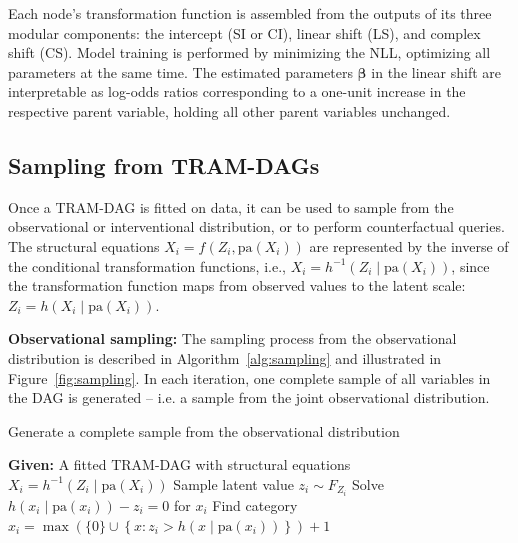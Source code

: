 Each node's transformation function is assembled from the outputs of its three modular components: the intercept (SI or CI), linear shift (LS), and complex shift (CS). Model training is performed by minimizing the NLL, optimizing all parameters at the same time. The estimated parameters $\boldsymbol{\beta}$ in the linear shift are interpretable as log-odds ratios corresponding to a one-unit increase in the respective parent variable, holding all other parent variables unchanged.




\subsection{Sampling from TRAM-DAGs} \label{methods:sampling}

Once a TRAM-DAG is fitted on data, it can be used to sample from the observational or interventional distribution, or to perform counterfactual queries. The structural equations $X_i = f(Z_i, \text{pa}(X_i))$ are represented by the inverse of the conditional transformation functions, i.e., $X_i = h^{-1}(Z_i \mid \text{pa}(X_i))$, since the transformation function maps from observed values to the latent scale: $Z_i = h(X_i \mid \text{pa}(X_i))$.


\medskip

\textbf{Observational sampling:} The sampling process from the observational distribution is described in Algorithm~\ref{alg:sampling} and illustrated in Figure~\ref{fig:sampling}. In each iteration, one complete sample of all variables in the DAG is generated -- i.e. a sample from the joint observational distribution.

\begin{algorithm}
\caption{Generate a complete sample from the observational distribution}
\label{alg:sampling}
\begin{algorithmic}
\State \textbf{Given:} A fitted TRAM-DAG with structural equations $X_i = h^{-1}(Z_i \mid \text{pa}(X_i))$
  \State Sample latent value $z_i \sim F_{Z_i}$ 
    \State Solve $h(x_i \mid \text{pa}(x_i)) - z_i = 0$ for $x_i$ 
    \State Find category $x_i = \max \left( \{0\} \cup \left\{ x : z_i > h(x \mid \text{pa}(x_i)) \right\} \right) + 1
$
  \EndIf
\EndFor
\end{algorithmic}
\end{algorithm}


